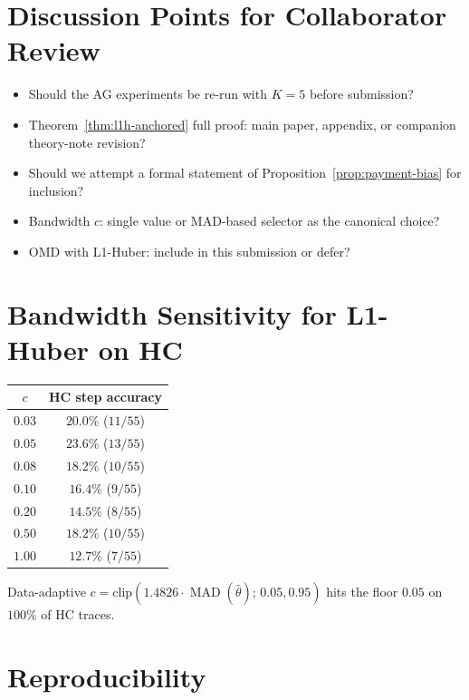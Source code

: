 \documentclass[11pt]{article}
\DeclareMathOperator{\MAD}{MAD}
\newcommand{\thetahat}{\hat{\theta}}
\begin{document}
\section{Discussion Points for Collaborator Review}

\begin{itemize}[leftmargin=*]
\item Should the AG experiments be re-run with $K = 5$ before submission?
\item Theorem~\ref{thm:l1h-anchored} full proof: main paper, appendix, or
companion theory-note revision?
\item Should we attempt a formal statement of
Proposition~\ref{prop:payment-bias} for inclusion?
\item Bandwidth $c$: single value or MAD-based selector as the canonical
choice?
\item OMD with L1-Huber: include in this submission or defer?
\end{itemize}

\appendix

\section{Bandwidth Sensitivity for L1-Huber on HC}
\label{sec:appendix-c-sensitivity}

\begin{center}
\begin{tabular}{cc}
\toprule
$c$ & HC step accuracy \\
\midrule
$0.03$ & $20.0\%$ ($11/55$) \\
$0.05$ & $\mathbf{23.6\%}$ ($13/55$) \\
$0.08$ & $18.2\%$ ($10/55$) \\
$0.10$ & $16.4\%$ ($9/55$) \\
$0.20$ & $14.5\%$ ($8/55$) \\
$0.50$ & $18.2\%$ ($10/55$) \\
$1.00$ & $12.7\%$ ($7/55$) \\
\bottomrule
\end{tabular}
\end{center}
Data-adaptive $c = \mathrm{clip}(1.4826 \cdot \MAD(\thetahat);\, 0.05, 0.95)$
hits the floor $0.05$ on $100\%$ of HC traces.

\section{Reproducibility}
\end{document}
